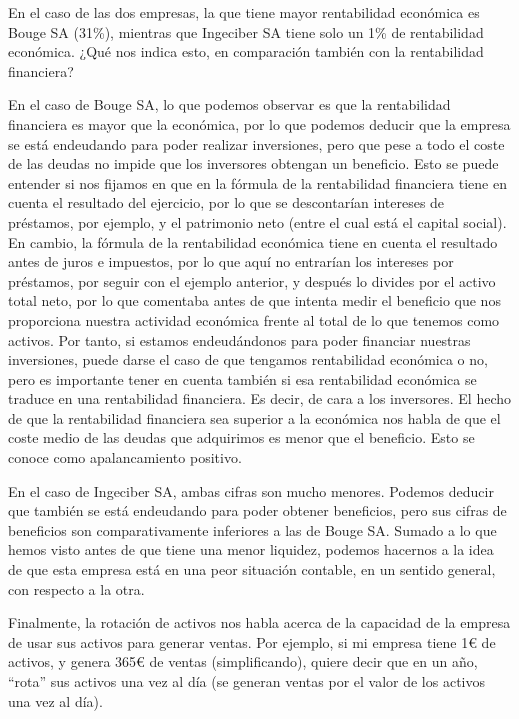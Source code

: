 \documentclass[a4paper]{article}
\begin{document}
En el caso de las dos empresas, la que tiene mayor rentabilidad económica es Bouge SA (31\%), mientras que Ingeciber SA tiene solo un 1\% de rentabilidad económica. ¿Qué nos indica esto, en comparación también con la rentabilidad financiera?

En el caso de Bouge SA, lo que podemos observar es que la rentabilidad financiera es mayor que la económica, por lo que podemos deducir que la empresa se está endeudando para poder realizar inversiones, pero que pese a todo el coste de las deudas no impide que los inversores obtengan un beneficio. Esto se puede entender si nos fijamos en que en la fórmula de la rentabilidad financiera tiene en cuenta el resultado del ejercicio, por lo que se descontarían intereses de préstamos, por ejemplo, y el patrimonio neto (entre el cual está el capital social). En cambio, la fórmula de la rentabilidad económica tiene en cuenta el resultado antes de juros e impuestos, por lo que aquí no entrarían los intereses por préstamos, por seguir con el ejemplo anterior, y después lo divides por el activo total neto, por lo que comentaba antes de que intenta medir el beneficio que nos proporciona nuestra actividad económica frente al total de lo que tenemos como activos. Por tanto, si estamos endeudándonos para poder financiar nuestras inversiones, puede darse el caso de que tengamos rentabilidad económica o no, pero es importante tener en cuenta también si esa rentabilidad económica se traduce en una rentabilidad financiera. Es decir, de cara a los inversores. El hecho de que la rentabilidad financiera sea superior a la económica nos habla de que el coste medio de las deudas que adquirimos es menor que el beneficio. Esto se conoce como apalancamiento positivo.

En el caso de Ingeciber SA, ambas cifras son mucho menores. Podemos deducir que también se está endeudando para poder obtener beneficios, pero sus cifras de beneficios son comparativamente inferiores a las de Bouge SA. Sumado a lo que hemos visto antes de que tiene una menor liquidez, podemos hacernos a la idea de que esta empresa está en una peor situación contable, en un sentido general, con respecto a la otra.

Finalmente, la rotación de activos nos habla acerca de la capacidad de la empresa de usar sus activos para generar ventas. Por ejemplo, si mi empresa tiene 1€ de activos, y genera 365€ de ventas (simplificando), quiere decir que en un año, ``rota'' sus activos una vez al día (se generan ventas por el valor de los activos una vez al día).
\end{document}
